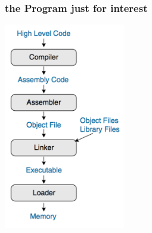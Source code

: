 		\subsubsection{the Program just for interest}
		\begin{center}
				\includegraphics[height = 9cm]{images/program}
		\end{center}
		

